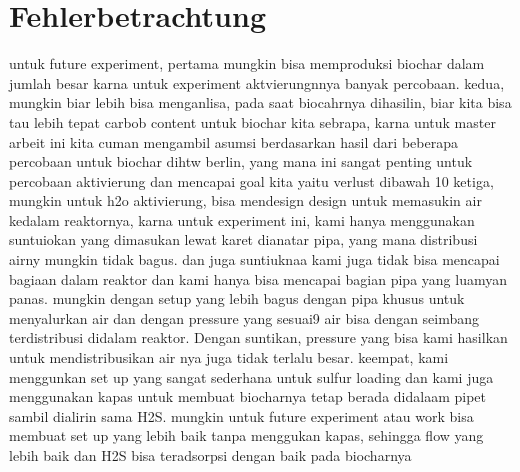 \newpage
\section{Fehlerbetrachtung}

untuk future experiment, pertama mungkin bisa memproduksi biochar dalam jumlah besar karna untuk experiment aktvierungnnya banyak percobaan. 
kedua, mungkin biar lebih bisa menganlisa, pada saat biocahrnya dihasilin, biar kita bisa tau lebih tepat carbob content untuk biochar kita sebrapa, karna untuk master arbeit ini kita cuman mengambil asumsi berdasarkan hasil dari beberapa percobaan untuk biochar dihtw berlin, yang mana ini sangat penting untuk percobaan aktivierung dan mencapai goal kita yaitu verlust dibawah 10%
ketiga, mungkin untuk h2o aktivierung, bisa mendesign design untuk memasukin air kedalam reaktornya, karna untuk experiment ini, kami hanya menggunakan suntuiokan yang dimasukan lewat karet dianatar pipa, yang mana distribusi airny mungkin tidak bagus. dan juga suntiuknaa kami juga tidak bisa mencapai bagiaan dalam reaktor dan kami hanya bisa mencapai bagian pipa yang luamyan panas. mungkin dengan setup yang lebih bagus dengan pipa khusus untuk menyalurkan air dan dengan pressure yang sesuai9 air bisa dengan seimbang terdistribusi didalam reaktor. Dengan suntikan, pressure yang bisa kami hasilkan untuk mendistribusikan air nya juga tidak terlalu besar.
keempat, kami menggunkan set up yang sangat sederhana untuk sulfur loading dan kami juga menggunakan kapas untuk membuat biocharnya tetap berada didalaam pipet sambil dialirin sama H2S. mungkin untuk future experiment atau work bisa membuat set up yang lebih baik tanpa menggukan kapas, sehingga flow yang lebih baik dan H2S bisa teradsorpsi dengan baik pada biocharnya